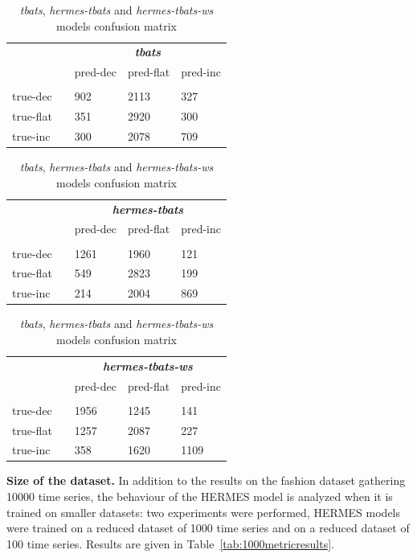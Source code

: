 \documentclass[review]{elsarticle}
\begin{document}
\begin{table}
  \caption{\textit{tbats}, \textit{hermes-tbats} and \textit{hermes-tbats-ws} models confusion matrix }
\centering
  \begin{tabular}{l||llll}
  	&& \multicolumn{3}{c}{\textbf{\textit{tbats}}}\\
    && pred-dec  & pred-flat & pred-inc  \\
    \hline
    \hline
    \rule{0pt}{2ex} \\
	true-dec && 902 & 2113 & 327 \\
    true-flat && 351 & 2920 & 300 \\
    true-inc && 300 & 2078 & 709 
  \end{tabular}

\vspace{.2cm}

  \begin{tabular}{l||llll}
  	&& \multicolumn{3}{c}{\textbf{\textit{hermes-tbats}}}\\
    && pred-dec  & pred-flat & pred-inc  \\
    \hline
    \hline
    \rule{0pt}{2ex} \\
	true-dec && 1261 & 1960 & 121 \\
    true-flat && 549 & 2823 & 199 \\
    true-inc && 214 & 2004 & 869 
  \end{tabular}

\vspace{.2cm}

  \begin{tabular}{l||llll}
    && \multicolumn{3}{c}{\textbf{\textit{hermes-tbats-ws}}}\\
    && pred-dec  & pred-flat & pred-inc  \\
    \hline
    \hline
    \rule{0pt}{2ex} \\
	true-dec && 1956 & 1245 & 141 \\
    true-flat && 1257 & 2087 & 227 \\
    true-inc && 358 & 1620 & 1109 
  \end{tabular}
\label{tab:tbatsclass}
\end{table}

\textbf{Size of the dataset. } In addition to the results on the fashion dataset gathering 10000 time series, the behaviour of the HERMES model is analyzed when it is trained on smaller datasets: two experiments were performed, HERMES models were trained on a reduced dataset of 1000 time series and on a reduced dataset of 100 time series. Results are given in Table~\ref{tab:1000metricresults}.
\end{document}
